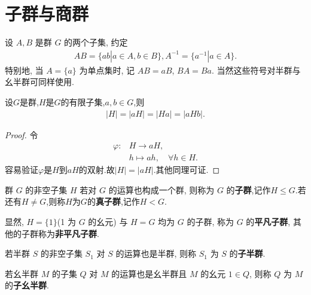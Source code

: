 \documentclass[../../main.tex]{subfiles}%
\begin{document}
\section{子群与商群}

\begin{definition}
设 \( A, B \) 是群 \( G \) 的两个子集, 约定
\begin{align*}
AB = \{ab|a \in A, b \in B\} , A^{-1} = \{a^{-1}|a \in A\}.
\end{align*}
特别地, 当 \( A = \{a\} \) 为单点集时, 记 \( AB = aB \), \( BA = Ba \). 当然这些符号对半群与幺半群可同样使用.
\end{definition}

\begin{proposition}\label{proposition:有限群乘积的阶}
设$G$是群,$H$是$G$的有限子集,$a,b\in G$,则
\begin{align*}
|H|=|aH| = |Ha| = |aHb| .
\end{align*}
\end{proposition}
\begin{proof}

令
\begin{align*}
\varphi : &H \longrightarrow aH, \\
&h \longmapsto ah,\quad \forall h \in H.
\end{align*}
容易验证$\varphi$是$H$到$aH$的双射.故$|H|=|aH|$.其他同理可证.

\end{proof}

\begin{definition}
群 \( G \) 的非空子集 \( H \) 若对 \( G \) 的运算也构成一个群, 则称为 \( G \) 的\textbf{子群},记作$H\leqslant G$.若还有$H\neq G$,则称$H$为$G$的\textbf{真子群},记作$H<G$.
\end{definition}
\begin{remark}
显然, \( H = \{1\} \)(1 为 \( G \) 的幺元) 与 \( H = G \) 均为 \( G \) 的子群, 称为 \( G \) 的\textbf{平凡子群}, 其他的子群称为\textbf{非平凡子群}.
\end{remark}

\begin{definition}
若半群 \( S \) 的非空子集 \( S_1 \) 对 \( S \) 的运算也是半群, 则称 \( S_1 \) 为 \( S \) 的\textbf{子半群}.

若幺半群 \( M \) 的子集 \( Q \) 对 \( M \) 的运算也是幺半群且 \( M \) 的幺元 \( 1 \in Q \), 则称 \( Q \) 为 \( M \) 的\textbf{子幺半群}.
\end{definition}
\end{document}
